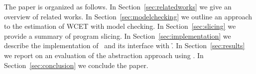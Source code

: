   The paper is organized as follows. In Section~\ref{sec:relatedworks} we give
  an overview of related works. In Section~\ref{sec:modelchecking} we outline an approach
  to the estimation of WCET with model checking. In Section~\ref{sec:slicing} we
  provide a summary of program slicing. In Section~\ref{sec:implementation} we
  describe the implementation of \best\ and its interface with \h. In
  Section~\ref{sec:results} we report on an evaluation of the abstraction approach using
  \best{}. In Section~\ref{sec:conclusion} we conclude
  the paper.

  
  

